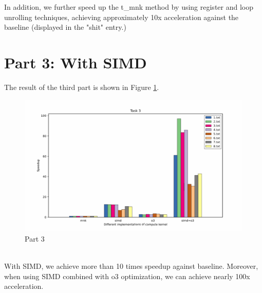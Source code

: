 \documentclass[]{article}
\begin{document}
In addition, we further speed up the t\_mnk method by using register and loop unrolling techniques, achieving approximately 10x acceleration against the baseline (displayed in the "shit" entry.)
\newpage
\section*{Part 3: With SIMD}
The result of the third part is shown in Figure \ref{fig:part3}.
\begin{figure}[h]
		\centering
		\includegraphics[width=1.0\textwidth]{task3.png}
		\caption{Part 3}
		\label{fig:part3}
\end{figure}
\\
With SIMD, we achieve more than 10 times speedup against baseline. Moreover, when using SIMD combined with o3 optimization, we can achieve nearly 100x acceleration.
\end{document}
